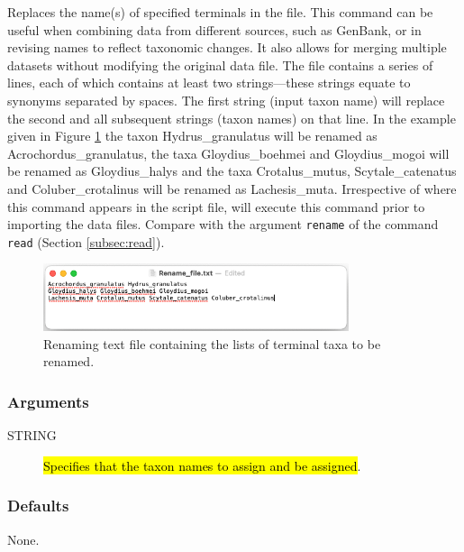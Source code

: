 	\begin{phygdescription}
	{Replaces the name(s) of specified terminals in the file. This command can be useful 
	when combining data from different sources, such as GenBank, or in revising names 
	to reflect taxonomic changes. It also allows for merging multiple datasets without 
	modifying the original data file. The file contains a series of lines, each of which contains at 
	least two strings---these strings equate to synonyms separated by spaces. The first string 
	(input taxon name) will replace the second and all subsequent strings (taxon names) on 
	that line. In the example given in Figure \ref{renamefile} the taxon Hydrus\_granulatus 
	will be renamed as Acrochordus\_granulatus, the taxa Gloydius\_boehmei and Gloydius\_mogoi
	will be renamed as Gloydius\_halys and the taxa Crotalus\_mutus, Scytale\_catenatus and 
	Coluber\_crotalinus will be renamed as Lachesis\_muta. Irrespective of where this 
	command appears in the script file, \phyg will execute this command prior to importing 
	the data files. Compare with the argument \texttt{rename} of the command \texttt{read} 
	(Section \ref{subsec:read}).
	
		\begin{figure}[H]
		\centering
		\includegraphics[width=0.8\textwidth]{Rename_file.jpg}
		\caption{Renaming text file containing the lists of terminal taxa to be renamed.}
		\label{renamefile}
		\end{figure}
		}
	\end{phygdescription}
	
	\subsubsection{Arguments}
	
	\begin{description}
		\item [STRING] \hl{Specifies that the taxon names to assign and be assigned}.
	\end{description}
		
	\subsubsection{Defaults}
		None.
		
